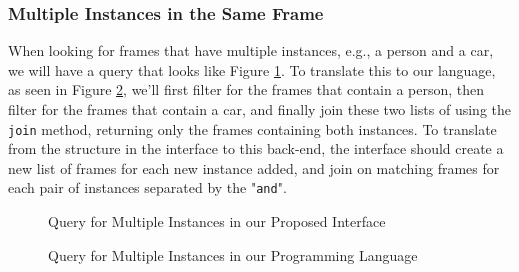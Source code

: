 \subsubsection{Multiple Instances in the Same Frame}
When looking for frames that have multiple instances, e.g., a person and a car, we will have a query that looks like Figure \ref{fig:Multiple1}. To translate this to our language, as seen in Figure \ref{fig:Multiple2}, we'll first filter for the frames that contain a person, then filter for the frames that contain a car, and finally join these two lists of  using the \texttt{join} method, returning only the frames containing both instances. 
To translate from the structure in the interface to this back-end, the interface should create a new list of frames for each new instance added, and join on matching frames for each pair of instances separated by the "\texttt{and}".

\begin{figure}[H]
    \caption{Query for Multiple Instances in our Proposed Interface}
    \label{fig:Multiple1}
\end{figure}

\begin{figure}[H]
    \caption{Query for Multiple Instances in our Programming Language}
    \label{fig:Multiple2}
\end{figure}

